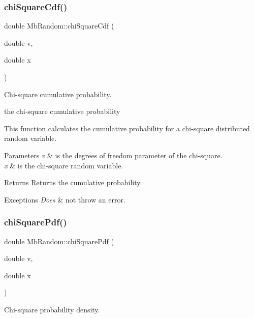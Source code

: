 \subsubsection{\texorpdfstring{chiSquareCdf()}{chiSquareCdf()}}
{\footnotesize\ttfamily double Mb\+Random\+::chi\+Square\+Cdf (\begin{DoxyParamCaption}\item[{double}]{v,  }\item[{double}]{x }\end{DoxyParamCaption})}



Chi-\/square cumulative probability. 

the chi-\/square cumulative probability

This function calculates the cumulative probability for a chi-\/square distributed random variable.


\begin{DoxyParams}{Parameters}
{\em v} & is the degrees of freedom parameter of the chi-\/square. \\
\hline
{\em x} & is the chi-\/square random variable. \\
\hline
\end{DoxyParams}
\begin{DoxyReturn}{Returns}
Returns the cumulative probability. 
\end{DoxyReturn}

\begin{DoxyExceptions}{Exceptions}
{\em Does} & not throw an error. \\
\hline
\end{DoxyExceptions}
\mbox{\label{class_mb_random_ad690dfe778f65e8fb6b00789396186fd}} 
\subsubsection{\texorpdfstring{chiSquarePdf()}{chiSquarePdf()}}
{\footnotesize\ttfamily double Mb\+Random\+::chi\+Square\+Pdf (\begin{DoxyParamCaption}\item[{double}]{v,  }\item[{double}]{x }\end{DoxyParamCaption})}



Chi-\/square probability density. 

